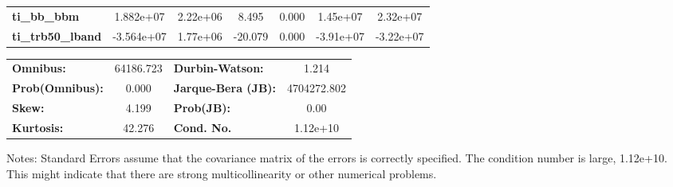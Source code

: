 \begin{center}
\begin{tabular}{lcccccc}
\textbf{ti\_bb\_bbm}        &    1.882e+07  &     2.22e+06     &     8.495  &         0.000        &     1.45e+07    &     2.32e+07     \\
\textbf{ti\_trb50\_lband}   &   -3.564e+07  &     1.77e+06     &   -20.079  &         0.000        &    -3.91e+07    &    -3.22e+07     \\
\bottomrule
\end{tabular}
\begin{tabular}{lclc}
\textbf{Omnibus:}       & 64186.723 & \textbf{  Durbin-Watson:     } &      1.214   \\
\textbf{Prob(Omnibus):} &    0.000  & \textbf{  Jarque-Bera (JB):  } & 4704272.802  \\
\textbf{Skew:}          &    4.199  & \textbf{  Prob(JB):          } &       0.00   \\
\textbf{Kurtosis:}      &   42.276  & \textbf{  Cond. No.          } &   1.12e+10   \\
\bottomrule
\end{tabular}
\end{center}

Notes: \newline
 [1] Standard Errors assume that the covariance matrix of the errors is correctly specified. \newline
 [2] The condition number is large, 1.12e+10. This might indicate that there are \newline
 strong multicollinearity or other numerical problems.

